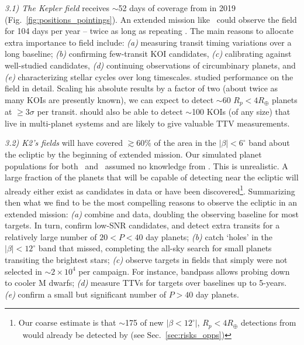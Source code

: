\textit{3.1) The Kepler field} receives $\sim$52 days of coverage from \tess in 2019 (Fig.~\ref{fig:positions_pointings}).
An extended mission like \npole\ could observe the field for 104 days per year -- twice as long as repeating \nhemi.
The main reasons to allocate extra importance to \keplers field include:
\textit{(a)} measuring transit timing variations over a long baseline;
\textit{(b)} confirming few-transit KOI candidates, 
\textit{(c)} calibrating \tess against well-studied candidates,
\textit{(d)} continuing observations of circumbinary planets, and
\textit{(e)} characterizing stellar cycles over long timescales. %
\citet{sullivan_KOIs_2013} studied \tesss performance on the field in detail.
Scaling his absolute results by a factor of two (about twice as many KOIs are presently known), we can expect \tess to detect $\sim$60 $R_p<4R_\oplus$ planets at $\geq3\sigma$ per transit.
\tess should also be able to detect $\sim$100 KOIs (of any size) that live in multi-planet systems and are likely to give valuable TTV measurements.

\textit{3.2) K2's fields} will have covered $\gtrsim\!60\%$ of the area in the $|\beta|<6^\circ$ band about the ecliptic by the beginning of \tesss extended mission.
Our simulated planet populations for both \elong\ and \eshort\ assumed no knowledge from \ktwo\!.
This is unrealistic.
A large fraction of the planets that \tess will be capable of detecting near the ecliptic will already either exist as candidates in \ktwos data or have been discovered\footnote{Our coarse estimate is that $\sim$175 of  new $|\beta<12^\circ|$, $R_p<4R_\oplus$ detections from \elong\ would already be detected by \ktwo (see Sec.~\protect\ref{sec:risks_opps})}.
Summarizing then what we find to be the most compelling reasons to observe the ecliptic in an extended \tess mission:
\textit{(a)} combine \tess and \ktwo data, doubling the \ktwo observing baseline for most targets. In turn, confirm low-SNR candidates, and detect extra transits for a relatively large number of $20<P<40$ day planets;
\textit{(b)} catch `holes' in the $|\beta| < 12^\circ$ band that \ktwo missed, completing the all-sky search for small planets transiting the brightest stars;
\textit{(c)} observe targets in \ktwo fields that simply were not selected in \ktwos $\sim\!2\times10^4$ per campaign. For instance, \tesss bandpass allows probing down to cooler M dwarfs;
\textit{(d)} measure TTVs for targets over baselines up to 5-years.
\textit{(e)} confirm a small but significant number of $P>40$ day planets.

